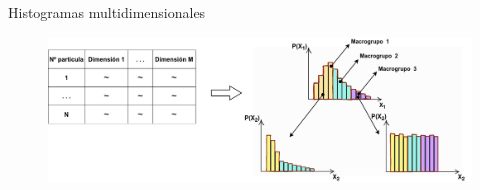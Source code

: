 \documentclass[aspectratio=169,english]{beamer}
\begin{document}


\begin{frame}{Histogramas multidimensionales}
    \begin{figure}
        \centering
        \includegraphics[width=1\linewidth]{imagens/tabla.png}
        \label{fig:esquema2}
    \end{figure}

    
\end{frame}
\end{document}
